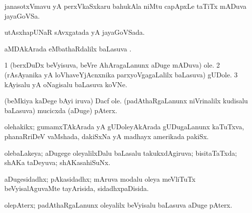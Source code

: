 \noindent
\gl{\pagu}
\bmng
{} janasotxVmavu yA perxVkaSxkaru bahukAla niMtu capApxLe taTiTx mADuva jayaGoVSa. 
\emng
\eentry

\bentry
{}
\gl{\gu}
\bmng
utAsxhapUNaR sAvxgatada yA jayaGoVSada. 
\emng
\eentry

\bentry
{}
\gl{\sapUpa}
\bmng
aMDAkArada eMbathaRdalilx baLasuva \sapUpa. 
\emng
\eentry

\bentry
{}
\gl{\nA}
\bmng
\bnum
\num{1} (berxDuDx beVyisuva, beVre AhAragaLanunx aDuge mADuva) ole. 
\num{2} (rAsAyanika yA loVhaveYjAcnxnika parxyoVgagaLalilx baLasuva) gUDole. 
\num{3} kAyisalu yA oNagisalu baLasuva koVNe. 
\enum
\emng

\noindent
\gl{\pagu}
\bmng
{} 
\banum
{} (beMkiya kaDege bAyi iruva) Dacf ole. 
 (padAthaRgaLanunx niVrinalilx kudisalu baLasuva) mucicxda (aDuge) pAterx. 
\eanum
\emng
\eentry

\bentry
{}
\gl{\nA}
\bmng
olehakikx; gumamxTAkArada yA gUDoleyAkArada gUDugaLanunx kaTuTxva, phanaRriDeV vaMshada, dakiSxNa yA madhayx amerikada pakiSx. 
\emng
\eentry

\bentry
{}
\gl{\gu}
\bmng
olebaLakeya; aDugege oleyalilxDalu baLasalu takukxdAgiruva; bisitaTaTxda; shAKa taDeyuva; shAKasahiSuNx. 
\emng
\eentry

\bentry
{}
\gl{\gu}
\bmng
aDugesidadhx; pAkasidadhx; mAruva modalu oleya meVliTuTx beVyisalAguvaMte tayArisida, sidadhxpaDisida. 
\emng
\eentry

\bentry
{}
\gl{\nA}
\bmng
olepAterx; padAthaRgaLanunx oleyalilx beVyisalu baLasuva aDuge pAterx. 
\emng
\eentry

